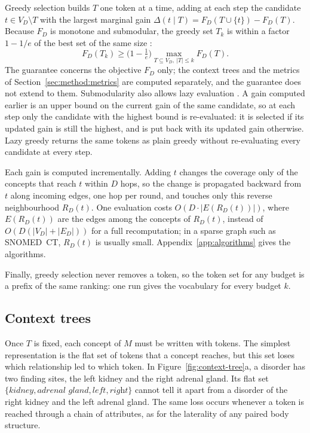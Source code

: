 Greedy selection builds $T$ one token at a time, adding at each step the candidate $t \in V_D \setminus T$ with the largest marginal gain $\Delta(t \mid T) = F_D(T \cup \{t\}) - F_D(T)$.
Because $F_D$ is monotone and submodular, the greedy set $T_k$ is within a factor $1 - 1/e$ of the best set of the same size \cite{nemhauser1978analysis}:
\begin{equation}
F_D(T_k) \ge \Big(1 - \tfrac{1}{e}\Big) \max_{T \subseteq V_D,\ |T| \le k} F_D(T).
\label{eq:guarantee}
\end{equation}
The guarantee concerns the objective $F_D$ only; the context trees and the metrics of Section~\ref{sec:method:metrics} are computed separately, and the guarantee does not extend to them.
Submodularity also allows lazy evaluation \cite{minoux1978accelerated}.
A gain computed earlier is an upper bound on the current gain of the same candidate, so at each step only the candidate with the highest bound is re-evaluated: it is selected if its updated gain is still the highest, and is put back with its updated gain otherwise.
Lazy greedy returns the same tokens as plain greedy without re-evaluating every candidate at every step.

Each gain is computed incrementally.
Adding $t$ changes the coverage only of the concepts that reach $t$ within $D$ hops, so the change is propagated backward from $t$ along incoming edges, one hop per round, and touches only this reverse neighbourhood $R_D(t)$.
One evaluation costs $O(D \cdot |E(R_D(t))|)$, where $E(R_D(t))$ are the edges among the concepts of $R_D(t)$, instead of $O(D(|V_D| + |E_D|))$ for a full recomputation; in a sparse graph such as SNOMED~CT, $R_D(t)$ is usually small.
Appendix~\ref{app:algorithms} gives the algorithms.

Finally, greedy selection never removes a token, so the token set for any budget is a prefix of the same ranking: one run gives the vocabulary for every budget $k$.

\subsection{Context trees}
\label{sec:method:tokenizer}

Once $T$ is fixed, each concept of $M$ must be written with tokens.
The simplest representation is the flat set of tokens that a concept reaches, but this set loses which relationship led to which token.
In Figure~\ref{fig:context-tree}a, a disorder has two finding sites, the left kidney and the right adrenal gland.
Its flat set $\{\textit{kidney}, \textit{adrenal gland}, \textit{left}, \textit{right}\}$ cannot tell it apart from a disorder of the right kidney and the left adrenal gland.
The same loss occurs whenever a token is reached through a chain of attributes, as for the laterality of any paired body structure.

